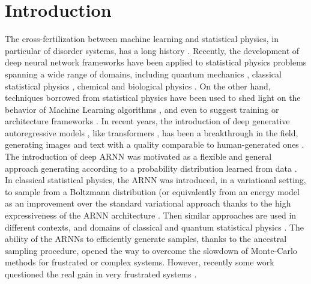 \documentclass[aps,physrev,10pt,floatfix,reprint]{revtex4-2}
\begin{document}
\section{Introduction} 
The cross-fertilization between machine learning and statistical physics, in particular of disorder systems, has a long history \cite{doi:10.1073/pnas.79.8.2554, PhysRevA.32.1007}.
Recently, the development of deep neural network frameworks \cite{bengioNatureDeepLearning2015} have been applied to statistical physics problems \cite{RevModPhys.91.045002} spanning a wide range of domains, including quantum mechanics \cite{doi:10.1126/science.aag2302, Nieuwenburg2017}, 
classical statistical physics \cite{Carrasquilla2017, Wu2019}, chemical and biological physics \cite{noe2019boltzmann,jumper2021highly}.
On the other hand, techniques borrowed from statistical physics have been used to shed light on the behavior of Machine Learning algorithms \cite{doi:10.1080/00018732.2016.1211393, Nguyen2017}, and even to suggest training or architecture frameworks \cite{Chaudhari_2019, pmlr-v37-sohl-dickstein15}.
In recent years, the introduction of deep generative autoregressive models \cite{pmlr-v37-germain15, NIPS2016_b1301141}, like transformers \cite{NIPS2017_3f5ee243}, has been a breakthrough in the field, generating images and text with a quality comparable to human-generated ones \cite{https://doi.org/10.48550/arxiv.2005.14165}.  
The introduction of deep ARNN was motivated as a flexible and general approach generating according to a probability distribution learned from data \cite{pmlr-v32-gregor14, pmlr-v15-larochelle11a, pmlr-v48-oord16}. In classical statistical physics, the ARNN was introduced, in a variational setting, to sample from a Boltzmann distribution (or equivalently from an energy model \cite{pmlr-v80-huang18d} as an improvement over the standard variational approach thanks to the high expressiveness of the ARNN architecture \cite{Wu2019}. Then similar approaches are used in different contexts, and domains of classical \cite{10.1103/physreve.101.023304,PhysRevE.101.053312,PhysRevE.103.012103,PhysRevResearch.3.L042024,10.1038/s42256-021-00401-3} and quantum statistical physics \cite{10.1103/physrevlett.128.090501,PhysRevA.102.062413,PhysRevLett.124.020503,PhysRevResearch.2.023358, Liu_2021, Barrett2022}. The ability of the ARNNs to efficiently generate samples, thanks to the ancestral sampling procedure, opened the way to overcome the slowdown of Monte-Carlo methods for frustrated or complex systems. However, recently some work questioned the real gain in very frustrated systems \cite{condmat7020038,https://doi.org/10.48550/arxiv.2210.11145}.
\end{document}
